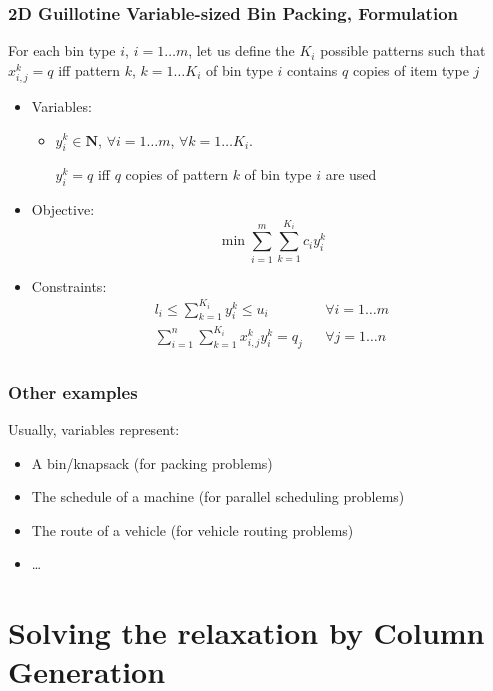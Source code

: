 \documentclass[10pt]{beamer}
\newcommand{\N}{\mathbf{N}}
\begin{document}
\begin{frame}
  \frametitle{2D Guillotine Variable-sized Bin Packing, Formulation}

  For each bin type $i$, $i = 1 \dots m$, let us define the $K_i$ possible patterns such that $x_{i, j}^k = q$ iff pattern $k$, $k = 1 \dots K_i$ of bin type $i$ contains $q$ copies of item type $j$

  \begin{itemize}
    \item Variables:
      \begin{itemize}
        \item $y_i^k \in \N$,
          $\forall i = 1 \dots m$, $\forall k = 1 \dots K_i$.

          $y_i^k = q$ iff $q$ copies of pattern $k$ of bin type $i$ are used
      \end{itemize}

    \item Objective:
      \begin{displaymath}
        \min \sum_{i = 1}^m \sum_{k = 1}^{K_i} c_i y_i^k
      \end{displaymath}

    \item Constraints:
      \begin{align*}
        l_i \le \sum_{k = 1}^{K_i} y_i^k \le u_i && \forall i = 1 \dots m \\
        \sum_{i = 1}^n \sum_{k = 1}^{K_i} x_{i, j}^k y_i^k = q_j && \forall j = 1 \dots n \\
      \end{align*}
  \end{itemize}
\end{frame}

\begin{frame}
  \frametitle{Other examples}

  Usually, variables represent:
  \begin{itemize}
    \item A bin/knapsack (for packing problems)
    \item The schedule of a machine (for parallel scheduling problems)
    \item The route of a vehicle (for vehicle routing problems)
    \item \dots
  \end{itemize}
\end{frame}

\section{Solving the relaxation by Column Generation}
\end{document}

